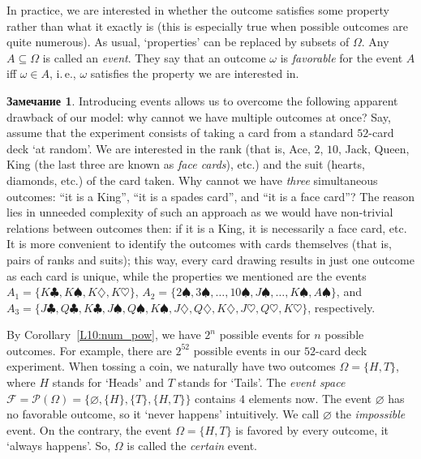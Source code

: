 \documentclass[12pt,notitlepage]{article}
\theoremstyle{plain}
\theoremstyle{definition}
\newtheorem{rem}[thm]{Замечание}
\theoremstyle{plain}
\newcommand{\sbs}{\subseteq}
\newcommand{\void}{\varnothing}
\newcommand{\mP}{\mathcal{P}}
\newcommand{\1}{\mathbf{1}}
\newcommand{\0}{\mathbf{0}}
\newcommand{\mF}{\mathcal{F}}
\begin{document}
In practice, we are interested in whether the outcome satisfies some property rather than what it exactly is (this is especially true when possible outcomes are quite numerous). As usual, `properties' can be replaced by subsets of $\Omega$. Any $A \sbs \Omega$ is called an \emph{event}. They say that an outcome $\omega$ is \emph{favorable} for the event $A$ iff $\omega \in A$, i.\,e., $\omega$ satisfies the property we are interested in.

\begin{rem}
	Introducing events allows us to overcome the following apparent drawback of our model: why cannot we have multiple outcomes at once? Say, assume that the experiment consists of taking a card from a standard $52$-card deck `at random'. We are interested in the rank (that is, Ace, $2$, $10$, Jack, Queen, King (the last three are known as \emph{face cards}), etc.) and the suit (hearts, diamonds, etc.) of the card taken. Why cannot we have \emph{three} simultaneous outcomes: ``it is a King'', ``it is a spades card'', and ``it is a face card''? The reason lies in unneeded complexity of such an approach as we would have non-trivial relations between outcomes then: if it is a King, it is necessarily a face card, etc. It is more convenient to identify the outcomes with cards themselves (that is, pairs of ranks and suits); this way, every card drawing results in just one outcome as each card is unique, while the properties we mentioned are the events $A_1 = \{K\clubsuit, K\spadesuit, K\diamondsuit, K\heartsuit\}$, $A_2 = \{2\spadesuit, 3\spadesuit, \ldots, 10\spadesuit, J\spadesuit, \ldots, K\spadesuit, A\spadesuit \}$, and $A_3 = \{J\clubsuit, Q\clubsuit, K\clubsuit, J\spadesuit, Q\spadesuit, K\spadesuit, J\diamondsuit, Q\diamondsuit, K\diamondsuit, J\heartsuit, Q\heartsuit, K\heartsuit\}$, respectively.
\end{rem}

By Corollary~\ref{L10:num_pow}, we have $2^n$ possible events for $n$ possible outcomes. For example, there are $2^{52}$ possible events in our $52$-card deck experiment. When tossing a coin, we naturally have two outcomes $\Omega = \{H, T\}$, where $H$ stands for `Heads' and $T$ stands for `Tails'. The \emph{event space} $\mF = \mP(\Omega) = \{\void, \{H\}, \{T\}, \{H, T\} \}$ contains $4$ elements now. The event $\void$ has no favorable outcome, so it `never happens' intuitively. We call $\void$ the \emph{impossible} event. On the contrary, the event $\Omega = \{H, T\}$ is favored by every outcome, it `always happens'. So, $\Omega$ is called the \emph{certain} event.
\end{document}
